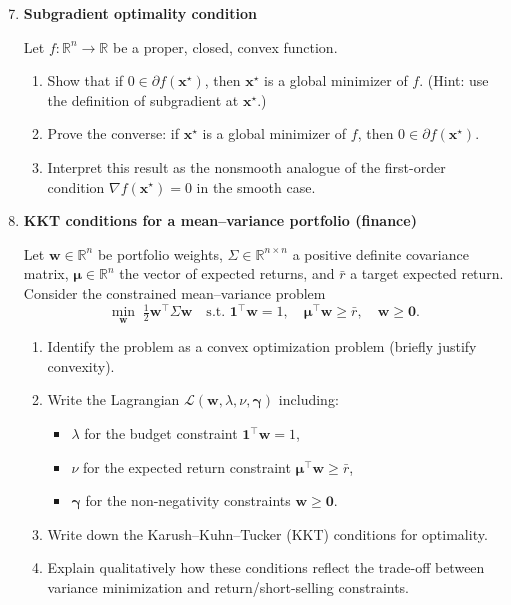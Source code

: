 \documentclass[11pt]{article}
\begin{document}
\begin{enumerate}
\setcounter{enumi}{6} %

\item \textbf{Subgradient optimality condition}

Let $f:\mathbb{R}^n \to \mathbb{R}$ be a proper, closed, convex function.

\begin{enumerate}
\item Show that if $0 \in \partial f(\bm{x}^\star)$, then $\bm{x}^\star$ is a global minimizer of $f$.
(Hint: use the definition of subgradient at $\bm{x}^\star$.)
\item Prove the converse: if $\bm{x}^\star$ is a global minimizer of $f$, then $0 \in \partial f(\bm{x}^\star)$.
\item Interpret this result as the nonsmooth analogue of the first-order condition $\nabla f(\bm{x}^\star)=0$ in the smooth case.
\end{enumerate}

\bigskip
\item \textbf{KKT conditions for a mean--variance portfolio (finance)}

Let $\bm{w} \in \mathbb{R}^n$ be portfolio weights, $\Sigma \in \mathbb{R}^{n\times n}$ a positive definite covariance matrix,
$\bm{\mu} \in \mathbb{R}^n$ the vector of expected returns, and $\bar{r}$ a target expected return.
Consider the constrained mean--variance problem
\[
\min_{\bm{w}} \; \tfrac{1}{2}\bm{w}^\top \Sigma \bm{w}
\quad \text{s.t. } \bm{1}^\top \bm{w} = 1,\quad \bm{\mu}^\top \bm{w} \ge \bar{r},\quad \bm{w}\ge \bm{0}.
\]

\begin{enumerate}
\item Identify the problem as a convex optimization problem (briefly justify convexity).
\item Write the Lagrangian $\mathcal{L}(\bm{w},\lambda,\nu,\bm{\gamma})$ including:
\begin{itemize}
  \item $\lambda$ for the budget constraint $\bm{1}^\top \bm{w}=1$,
  \item $\nu$ for the expected return constraint $\bm{\mu}^\top \bm{w}\ge \bar{r}$,
  \item $\bm{\gamma}$ for the non-negativity constraints $\bm{w}\ge \bm{0}$.
\end{itemize}
\item Write down the Karush--Kuhn--Tucker (KKT) conditions for optimality.
\item Explain qualitatively how these conditions reflect the trade-off between variance minimization and return/short-selling constraints.
\end{enumerate}


\end{enumerate}
\end{document}
